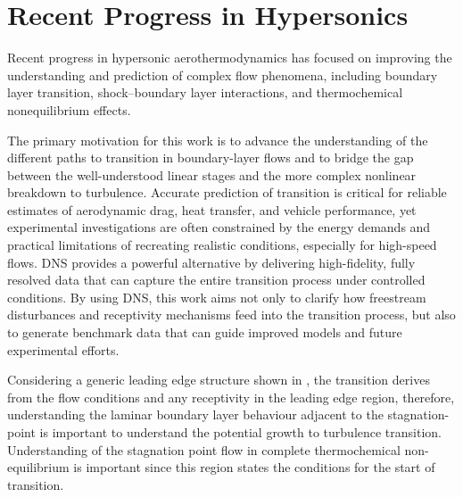 



\section{Recent Progress in Hypersonics}\label{section:introduction/recentprogress}

Recent progress in hypersonic aerothermodynamics has focused on improving the understanding and prediction of complex flow phenomena, including boundary layer transition, shock–boundary layer interactions, and thermochemical nonequilibrium effects.




The primary motivation for this work is to advance the understanding of the different paths to transition in boundary-layer flows and to bridge the gap between the well-understood linear stages and the more complex nonlinear breakdown to turbulence. Accurate prediction of transition is critical for reliable estimates of aerodynamic drag, heat transfer, and vehicle performance, yet experimental investigations are often constrained by the energy demands and practical limitations of recreating realistic conditions, especially for high-speed flows. \gls{DNS} provides a powerful alternative by delivering high-fidelity, fully resolved data that can capture the entire transition process under controlled conditions. By using DNS, this work aims not only to clarify how freestream disturbances and receptivity mechanisms feed into the transition process, but also to generate benchmark data that can guide improved models and future experimental efforts.

Considering a generic leading edge structure shown in , the transition derives from the flow conditions and any receptivity in the leading edge region, therefore, understanding the laminar boundary layer behaviour adjacent to the stagnation-point is important to understand the potential growth to turbulence transition. Understanding of the stagnation point flow in complete thermochemical non-equilibrium is
important since this region states the conditions for the start of transition.


